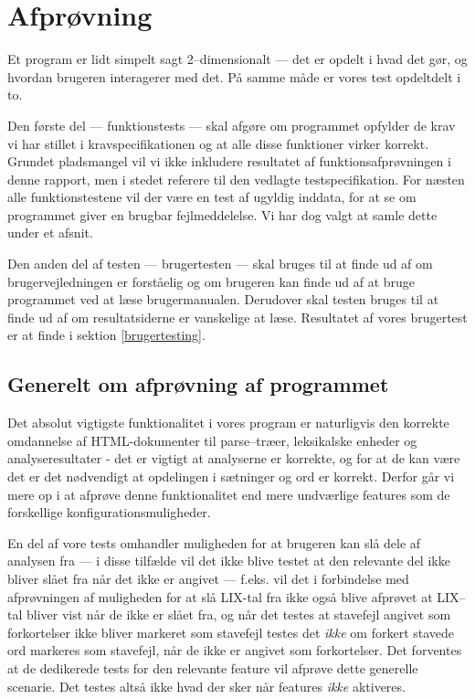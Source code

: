 \documentclass[a4paper,oneside]{memoir}
\begin{document}
\chapter{Afprøvning}

Et program er lidt simpelt sagt 2--dimensionalt --- det er opdelt i
hvad det gør, og hvordan brugeren interagerer med det. På samme måde
er vores test opdeltdelt i to. 

Den første del --- funktionstests --- skal afgøre om programmet
opfylder de krav vi har stillet i kravspecifikationen og at alle disse
funktioner virker korrekt. Grundet pladsmangel vil vi ikke inkludere
resultatet af funktionsafprøvningen i denne rapport, men i stedet
referere til den vedlagte testspecifikation. For næsten alle
funktionstestene vil der være en test af ugyldig inddata, for at se om
programmet giver en brugbar fejlmeddelelse. Vi har dog valgt at samle
dette under et afsnit. 

Den anden del af testen --- brugertesten --- skal bruges til at finde
ud af om brugervejledningen er forståelig og om brugeren kan finde ud
af at bruge programmet ved at læse brugermanualen. Derudover skal
testen bruges til at finde ud af om resultatsiderne er vanskelige at
læse. Resultatet af vores brugertest er at finde i sektion
\ref{brugertesting}.

\section{Generelt om afprøvning af programmet}

Det absolut vigtigste funktionalitet i vores program er naturligvis
den korrekte omdannelse af HTML-dokumenter til parse--træer,
leksikalske enheder og analyseresultater - det er vigtigt at
analyserne er korrekte, og for at de kan være det er det nødvendigt at
opdelingen i sætninger og ord er korrekt. Derfor går vi mere op i at
afprøve denne funktionalitet end mere undværlige features som de
forskellige konfigurationsmuligheder.

En del af vore tests omhandler muligheden for at brugeren kan slå dele
af analysen fra --- i disse tilfælde vil det ikke blive testet at den
relevante del ikke bliver slået fra når det ikke er angivet ---
f.eks. vil det i forbindelse med afprøvningen af muligheden for at slå
LIX-tal fra ikke også blive afprøvet at LIX--tal bliver vist når de
ikke er slået fra, og når det testes at stavefejl angivet som
forkortelser ikke bliver markeret som stavefejl testes det
\textit{ikke} om forkert stavede ord markeres som stavefejl, når de
ikke er angivet som forkortelser. Det forventes at de dedikerede tests
for den relevante feature vil afprøve dette generelle scenarie. Det
testes altså ikke hvad der sker når features \textit{ikke} aktiveres.
\end{document}
